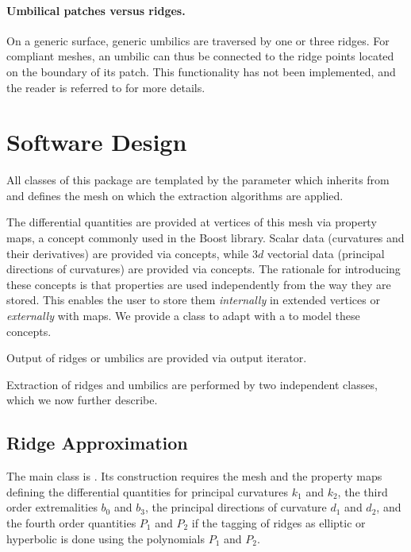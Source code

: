 \paragraph{Umbilical patches versus ridges.} On a generic surface,
generic umbilics are traversed by one or three ridges. For compliant
meshes, an umbilic can thus be connected to the ridge points located
on the boundary of its patch. This functionality has not been
implemented, and the reader is referred to \cite{cgal:cp-tdare-05} for
more details.

\section{Software Design}
\label{soft}

All classes of this package are templated by the parameter
 which inherits from 
and defines the mesh on which the extraction algorithms are applied.

The differential quantities are provided at vertices of this mesh via
property maps, a concept commonly used in the Boost library. Scalar
data (curvatures and their derivatives) are provided via
 concepts, while  $3d$ vectorial data (principal
directions of curvatures) are provided via
 concepts. 
The rationale for introducing these concepts is that properties are
used independently from the way they are stored. This enables the user
to store them {\em internally} in extended vertices or {\em externally}
with maps. We provide a class
 to adapt  with 
a  to model these concepts.


Output of ridges or umbilics are provided via output iterator.

Extraction of ridges and umbilics are performed by two independent
classes, which we now further describe.

\subsection{Ridge Approximation}


The main class is
.
Its construction requires the mesh and the property maps defining the
differential quantities for principal curvatures $k_1$ and $k_2$, the
third order extremalities $b_0$ and $b_3$, the principal directions of
curvature $d_1$ and $d_2$, and the fourth order quantities $P_1$ and
$P_2$ if the tagging of ridges as elliptic or hyperbolic is done using
the polynomials $P_1$ and $P_2$.


